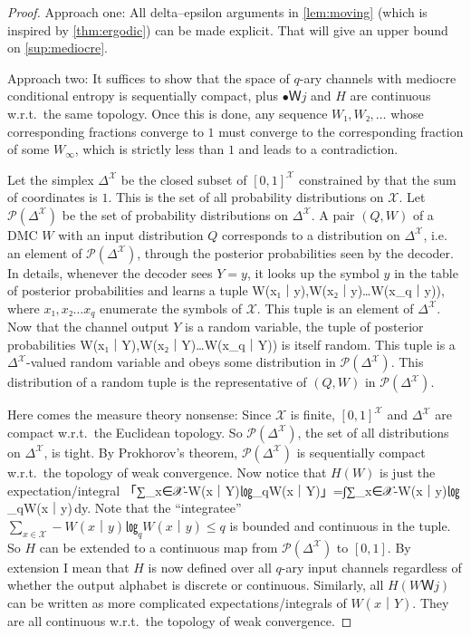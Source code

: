 \documentclass[openany]{amsbook}
\numberwithin{equation}{chapter}
\numberwithin{figure}{chapter}
\numberwithin{table}{chapter}
\def\diff{\mathrm d}
\def\[#1\]{\begin{equation*}{#1}\end{equation*}}
\theoremstyle{definition}	理dfn:Definition~?s			理exa:Example~?s
\theoremstyle{remark}		理cla:Claim~?s				理rem:Remark~?s
\begin{document}
	\begin{proof}
		Approach one:
		All delta--epsilon arguments in \cref{lem:moving}
		(which is inspired by \cref{thm:ergodic}) can be made explicit.
		That will give an upper bound on \cref{sup:mediocre}.
		
		Approach two:
		It suffices to show that the space of $q$-ary channels
		with mediocre conditional entropy is sequentially compact,
		plus $•Ｗj$ and $H$ are continuous w.r.t.\ the same topology.
		Once this is done, any sequence $W₁,W₂,\dotsc$ whose corresponding fractions
		converge to $1$ must converge to the corresponding fraction of some $W_∞$,
		which is strictly less than $1$ and leads to a contradiction.
		
		Let the simplex $Δ^𝒳$ be the closed subset of $[0,1]^𝒳$
		constrained by that the sum of coordinates is $1$.
		This is the set of all probability distributions on $𝒳$.
		Let $𝒫(Δ^𝒳)$ be the set of probability distributions on $Δ^𝒳$.
		A pair $(Q,W)$ of a DMC $W$ with an input distribution $Q$
		corresponds to a distribution on $Δ^𝒳$, i.e. an element of $𝒫(Δ^𝒳)$,
		through the posterior probabilities seen by the decoder.
		In details, whenever the decoder sees $Y=y$,
		it looks up the symbol $y$ in the table of
		posterior probabilities and learns a tuple
		\[(W(x₁｜y),W(x₂｜y)…W(x_q｜y)),\]
		where $x₁,x₂…x_q$ enumerate the symbols of $𝒳$.
		This tuple is an element of $Δ^𝒳$.
		Now that the channel output $Y$ is a random variable,
		the tuple of posterior probabilities
		\[(W(x₁｜Y),W(x₂｜Y)…W(x_q｜Y))\]
		is itself random.
		This tuple is a $Δ^𝒳$-valued random variable
		and obeys some distribution in $𝒫(Δ^𝒳)$.
		This distribution of a random tuple is
		the representative of $(Q,W)$ in $𝒫(Δ^𝒳)$.
		
		Here comes the measure theory nonsense:
		Since $𝒳$ is finite, $[0,1]^𝒳$ and $Δ^𝒳$
		are compact w.r.t.\ the Euclidean topology.
		So $𝒫(Δ^𝒳)$, the set of all distributions on $Δ^𝒳$, is tight.
		By Prokhorov's theorem, $𝒫(Δ^𝒳)$ is sequentially compact
		w.r.t.\ the topology of weak convergence.
		Now notice that $H(W)$ is just the expectation/integral
		\[E「∑_{x∈𝒳}-W(x｜Y)㏒_qW(x｜Y)」=∫∑_{x∈𝒳}-W(x｜y)㏒_qW(x｜y)\,\diff y.\]
		Note that the “integratee” $∑_{x∈𝒳}-W(x｜y)㏒_qW(x｜y)≤q$
		is bounded and continuous in the tuple.
		So $H$ can be extended to a continuous map from $𝒫(Δ^𝒳)$ to $[0,1]$.
		By extension I mean that $H$ is now defined over all $q$-ary input channels
		regardless of whether the output alphabet is discrete or continuous.
		Similarly, all $H(WＷj)$ can be written as
		more complicated expectations/integrals of $W(x｜Y)$.
		They are all continuous w.r.t.\ the topology of weak convergence.
		

\end{proof}
\end{document}
